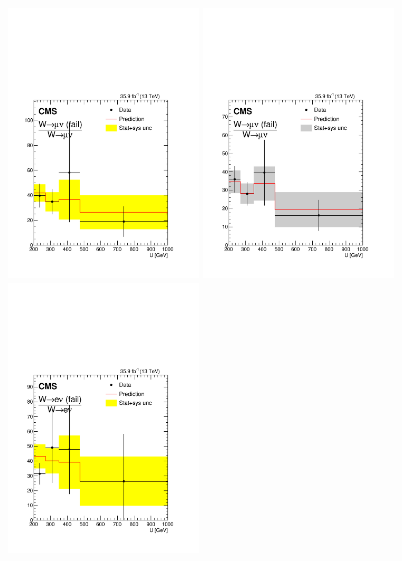 \begin{figure}
\centering
\includegraphics[width=0.45\textwidth]{figures/pullsImpact/ratio_wmn_fail_wmn_shapes_prefit.pdf}
\includegraphics[width=0.45\textwidth]{figures/pullsImpact/ratio_wmn_fail_wmn_shapes_fit_b.pdf}\\
\includegraphics[width=0.45\textwidth]{figures/pullsImpact/ratio_wen_fail_wen_shapes_prefit.pdf}

\end{figure}
